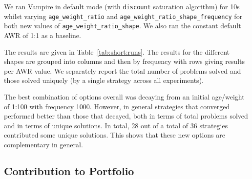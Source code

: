\documentclass{llncs}
\begin{document}
We ran Vampire in default mode (with {\tt discount} saturation algorithm) for 10s whilst varying  \texttt{age\_weight\_ratio} and \texttt{age\_weight\_ratio\_shape\_frequency} for both new values of \texttt{age\_weight\_ratio\_shape}. We also ran the constant default AWR of 1:1 as a baseline. 

The results are given in Table~\ref{tab:short:runs}. The results for the different shapes are grouped into columns and then by frequency with rows giving results per AWR value.
We separately report the total number of problems solved and those solved uniquely (by a single strategy across all experiments).

The best combination of options overall was decaying from an initial age/weight of 1:100 with frequency 1000.
However, in general strategies that converged performed better than those that decayed, both in terms of total problems solved and in terms of unique solutions.
In total, 28 out of a total of 36 strategies contributed some unique solutions. This shows that these new options are complementary in general.

\subsection{Contribution to Portfolio}
\end{document}
